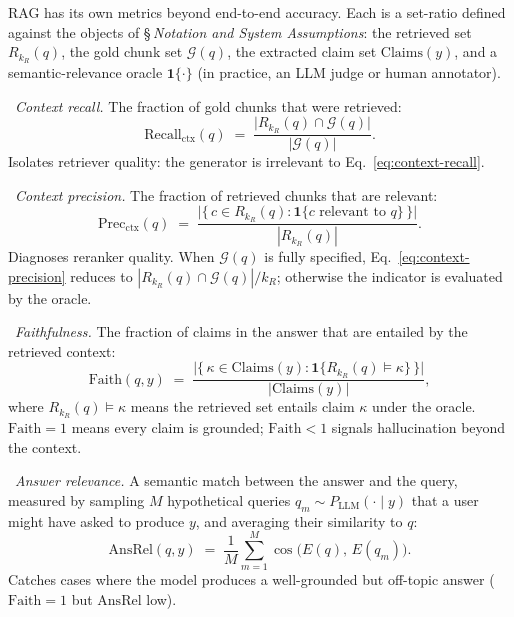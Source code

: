 RAG has its own metrics beyond end-to-end accuracy. Each is a
set-ratio defined against the objects of
\S\,\emph{Notation and System Assumptions}: the retrieved set
$R_{k_R}(q)$, the gold chunk set $\mathcal{G}(q)$, the extracted claim
set $\mathrm{Claims}(y)$, and a semantic-relevance oracle
$\mathbf{1}\{\cdot\}$ (in practice, an LLM judge or human
annotator).

\Def\ \emph{Context recall.} The fraction of gold chunks that were
retrieved:
\begin{equation}
  \mathrm{Recall}_{\mathrm{ctx}}(q)
  \;=\; \frac{\bigl|R_{k_R}(q) \cap \mathcal{G}(q)\bigr|}
             {|\mathcal{G}(q)|}.
  \label{eq:context-recall}
\end{equation}
Isolates retriever quality: the generator is irrelevant to
Eq.~\eqref{eq:context-recall}.

\Def\ \emph{Context precision.} The fraction of retrieved chunks
that are relevant:
\begin{equation}
  \mathrm{Prec}_{\mathrm{ctx}}(q)
  \;=\; \frac{\bigl|\{\, c \in R_{k_R}(q)
              : \mathbf{1}\{c \text{ relevant to } q\} \,\}\bigr|}
             {|R_{k_R}(q)|}.
  \label{eq:context-precision}
\end{equation}
Diagnoses reranker quality. When $\mathcal{G}(q)$ is fully specified,
Eq.~\eqref{eq:context-precision} reduces to
$|R_{k_R}(q) \cap \mathcal{G}(q)| / k_R$; otherwise the indicator is
evaluated by the oracle.

\Def\ \emph{Faithfulness.} The fraction of claims in the answer
that are entailed by the retrieved context:
\begin{equation}
  \mathrm{Faith}(q, y)
  \;=\; \frac{\bigl|\{\, \kappa \in \mathrm{Claims}(y)
              : \mathbf{1}\{R_{k_R}(q) \vDash \kappa\} \,\}\bigr|}
             {|\mathrm{Claims}(y)|},
  \label{eq:faithfulness}
\end{equation}
where $R_{k_R}(q) \vDash \kappa$ means the retrieved set entails
claim $\kappa$ under the oracle. $\mathrm{Faith} = 1$ means every
claim is grounded; $\mathrm{Faith} < 1$ signals hallucination
beyond the context.

\Def\ \emph{Answer relevance.} A semantic match between the answer
and the query, measured by sampling $M$ hypothetical queries
$q_m \sim P_{\mathrm{LLM}}(\cdot \mid y)$ that a user might have
asked to produce $y$, and averaging their similarity to $q$:
\begin{equation}
  \mathrm{AnsRel}(q, y)
  \;=\; \frac{1}{M} \sum_{m=1}^{M}
        \cos\!\bigl(E(q),\, E(q_m)\bigr).
  \label{eq:answer-relevance}
\end{equation}
Catches cases where the model produces a well-grounded but
off-topic answer ($\mathrm{Faith} = 1$ but $\mathrm{AnsRel}$ low).

